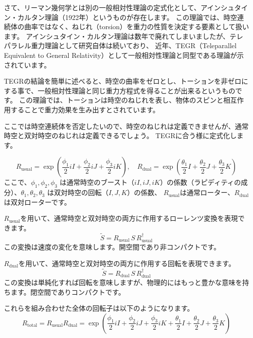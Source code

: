 \documentclass[a4paper,12pt,notitlepage]{jsreport}
\begin{document}
さて、リーマン幾何学とは別の一般相対性理論の定式化として、アインシュタイン・カルタン理論（1922年）というものが存在します。
この理論では、時空連続体の曲率ではなく、ねじれ（torsion）を重力の性質を決定する要素として扱います。
アインシュタイン・カルタン理論は数年で廃れてしまいましたが、テレパラレル重力理論として研究自体は続いており、
近年、TEGR（Teleparallel Equivalent to General Relativity）として一般相対性理論と同型である理論が示されています。

TEGRの結論を簡単に述べると、時空の曲率をゼロとし、トーションを非ゼロにする事で、一般相対性理論と同じ重力方程式を得ることが出来るというものです。
この理論では、トーションは時空のねじれを表し、物体のスピンと相互作用することで重力効果を生み出すとされています。

ここでは時空連続体を否定したいので、時空のねじれは定義できませんが、通常時空と双対時空のねじれは定義できるでしょう。
TEGRに合う様に定式化します。

\begin{equation}
  R_\text{usual} = \exp\left( \frac{\phi_1}{2} iI + \frac{\phi_2}{2} iJ + \frac{\phi_3}{2} iK \right), 
  \quad R_\text{dual} = \exp\left( \frac{\theta_1}{2} I + \frac{\theta_2}{2} J + \frac{\theta_3}{2} K \right)
\end{equation}
ここで、$\phi_1, \phi_2, \phi_3$ は通常時空のブースト（$iI,iJ,iK$）の係数（ラピディティの成分）、$\theta_1, \theta_2, \theta_3$ は双対時空の回転（$I,J,K$）の係数、
$ R_\text{usual} $は通常ローター、$ R_\text{dual} $は双対ローターです。

$ R_\text{usual} $を用いて、通常時空と双対時空の両方に作用するローレンツ変換を表現できます。
\begin{equation}
  \tilde{S} = R_\text{usual} \, S \, R_\text{usual}^\dagger
\end{equation}
この変換は速度の変化を意味します。開空間であり非コンパクトです。

$ R_\text{dual} $を用いて、通常時空と双対時空の両方に作用する回転を表現できます。
\begin{equation}
  \tilde{S} = R_\text{dual} \, S \, R_\text{dual}^\dagger
\end{equation}
この変換は単純化すれば回転を意味しますが、物理的にはもっと豊かな意味を持ちます。閉空間でありコンパクトです。

これらを組み合わせた全体の回転子は以下のようになります。
\begin{equation}
  R_\text{total} = R_\text{usual}R_\text{dual} = \exp\left( \frac{\phi_1}{2} iI + \frac{\phi_2}{2} iJ + \frac{\phi_3}{2} iK + \frac{\theta_1}{2} I + \frac{\theta_2}{2} J + \frac{\theta_3}{2} K \right)
\end{equation}
\end{document}
